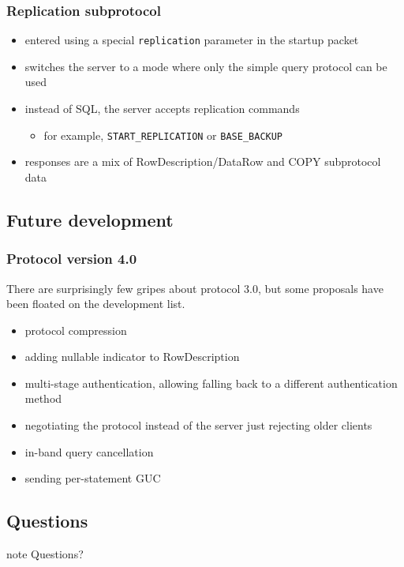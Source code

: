 \documentclass{beamer}
\begin{document}
\begin{frame}
  \frametitle{Replication subprotocol}

  \begin{itemize}
  \item entered using a special \texttt{replication} parameter in the startup
    packet
  \item switches the server to a mode where only the simple query protocol can
    be used
  \item instead of SQL, the server accepts replication commands
    \begin{itemize}
    \item for example, \texttt{START\_REPLICATION} or \texttt{BASE\_BACKUP}
    \end{itemize}
  \item responses are a mix of RowDescription/DataRow and COPY subprotocol data
  \end{itemize}
\end{frame}

\subsection{Future development}
\begin{frame}
  \frametitle{Protocol version 4.0}

  There are surprisingly few gripes about protocol 3.0, but some proposals have
  been floated on the development list.

  \begin{itemize}
  \item protocol compression
  \item adding nullable indicator to RowDescription
  \item multi-stage authentication, allowing falling back to a different
    authentication method
  \item negotiating the protocol instead of the server just rejecting older
    clients
  \item in-band query cancellation
  \item sending per-statement GUC
  \end{itemize}
\end{frame}

\subsection*{Questions}

\begin{frame}
\begin{beamercolorbox}[center]{note}
  \Huge Questions?
\end{beamercolorbox}
\end{frame}
\end{document}
